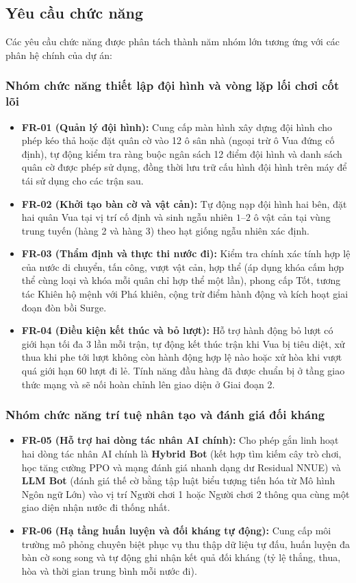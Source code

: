 \subsection{Yêu cầu chức năng}
Các yêu cầu chức năng được phân tách thành năm nhóm lớn tương ứng với các phân hệ chính của dự án:

\subsubsection{Nhóm chức năng thiết lập đội hình và vòng lặp lối chơi cốt lõi}
\begin{itemize}
    \item \textbf{FR-01 (Quản lý đội hình):} Cung cấp màn hình xây dựng đội hình cho phép kéo thả hoặc đặt quân cờ vào 12 ô sân nhà (ngoại trừ ô Vua đứng cố định), tự động kiểm tra ràng buộc ngân sách 12 điểm đội hình và danh sách quân cờ được phép sử dụng, đồng thời lưu trữ cấu hình đội hình trên máy để tái sử dụng cho các trận sau.
    \item \textbf{FR-02 (Khởi tạo bàn cờ và vật cản):} Tự động nạp đội hình hai bên, đặt hai quân Vua tại vị trí cố định và sinh ngẫu nhiên $1$--$2$ ô vật cản tại vùng trung tuyến (hàng 2 và hàng 3) theo hạt giống ngẫu nhiên xác định.
    \item \textbf{FR-03 (Thẩm định và thực thi nước đi):} Kiểm tra chính xác tính hợp lệ của nước di chuyển, tấn công, vượt vật cản, hợp thể (áp dụng khóa cấm hợp thể cùng loại và khóa mỗi quân chỉ hợp thể một lần), phong cấp Tốt, tương tác Khiên hộ mệnh với Phá khiên, cộng trừ điểm hành động và kích hoạt giai đoạn đòn bồi Surge.
    \item \textbf{FR-04 (Điều kiện kết thúc và bỏ lượt):} Hỗ trợ hành động bỏ lượt có giới hạn tối đa $3$ lần mỗi trận, tự động kết thúc trận khi Vua bị tiêu diệt, xử thua khi phe tới lượt không còn hành động hợp lệ nào hoặc xử hòa khi vượt quá giới hạn $60$ lượt đi lẻ. Tính năng đầu hàng đã được chuẩn bị ở tầng giao thức mạng và sẽ nối hoàn chỉnh lên giao diện ở Giai đoạn 2.
\end{itemize}

\subsubsection{Nhóm chức năng trí tuệ nhân tạo và đánh giá đối kháng}
\begin{itemize}
    \item \textbf{FR-05 (Hỗ trợ hai dòng tác nhân AI chính):} Cho phép gắn linh hoạt hai dòng tác nhân AI chính là \textbf{Hybrid Bot} (kết hợp tìm kiếm cây trò chơi, học tăng cường PPO và mạng đánh giá nhanh dạng dư Residual NNUE) và \textbf{LLM Bot} (đánh giá thế cờ bằng tập luật biểu tượng tiến hóa từ Mô hình Ngôn ngữ Lớn) vào vị trí Người chơi 1 hoặc Người chơi 2 thông qua cùng một giao diện nhận nước đi thống nhất.
    \item \textbf{FR-06 (Hạ tầng huấn luyện và đối kháng tự động):} Cung cấp môi trường mô phỏng chuyên biệt phục vụ thu thập dữ liệu tự đấu, huấn luyện đa bàn cờ song song và tự động ghi nhận kết quả đối kháng (tỷ lệ thắng, thua, hòa và thời gian trung bình mỗi nước đi).
\end{itemize}


